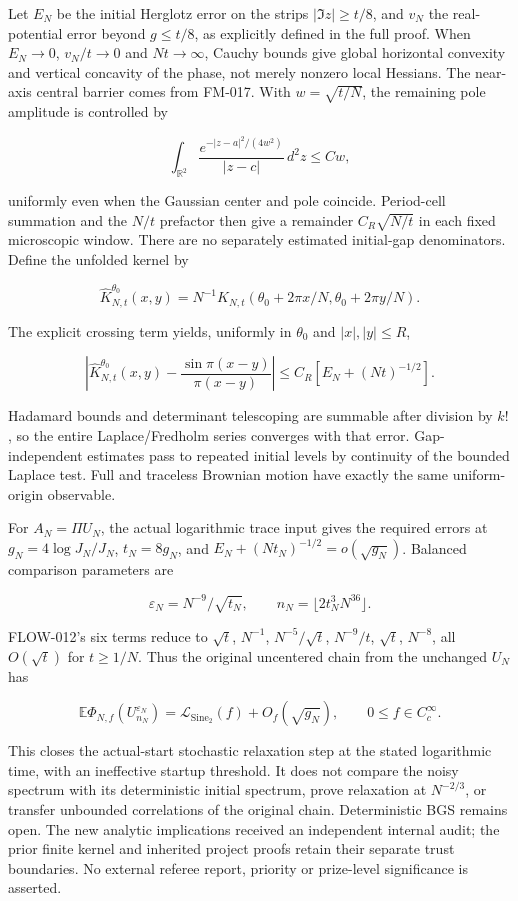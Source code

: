 Let \(E_N\) be the initial Herglotz error on the strips \(|\Im z|\ge t/8\),
and \(v_N\) the real-potential error beyond \(g\le t/8\), as explicitly
defined in the full proof. When \(E_N\to0\), \(v_N/t\to0\) and \(Nt\to\infty\),
Cauchy bounds give global horizontal convexity and vertical concavity
of the phase, not merely nonzero local Hessians. The near-axis central
barrier comes from FM-017. With \(w=\sqrt{t/N}\), the remaining pole
amplitude is controlled by

\[
\int_{\mathbb R^2}\frac{e^{-|z-a|^2/(4w^2)}}{|z-c|}\,d^2z\le Cw,
\]

uniformly even when the Gaussian center and pole coincide.
Period-cell summation and the \(N/t\) prefactor then give a remainder
\(C_R\sqrt{N/t}\) in each fixed microscopic window. There are no separately
estimated initial-gap denominators. Define the unfolded kernel by

\[
\widehat K_{N,t}^{\theta_0}(x,y)
=N^{-1}K_{N,t}(\theta_0+2\pi x/N,\theta_0+2\pi y/N).
\]

The explicit crossing term yields, uniformly in \(\theta_0\) and \(|x|,|y|\le R\),

\[
\left|\widehat K_{N,t}^{\theta_0}(x,y)
-\frac{\sin\pi(x-y)}{\pi(x-y)}\right|
\le C_R[E_N+(Nt)^{-1/2}].
\]

Hadamard bounds and determinant telescoping are summable after division
by \(k!\), so the entire Laplace/Fredholm series converges with that error.
Gap-independent estimates pass to repeated initial levels by continuity
of the bounded Laplace test. Full and traceless Brownian motion have
exactly the same uniform-origin observable.

For \(A_N=\Pi U_N\), the actual logarithmic trace input gives the required
errors at \(g_N=4\log J_N/J_N\), \(t_N=8g_N\), and
\(E_N+(Nt_N)^{-1/2}=o(\sqrt{g_N})\). Balanced comparison parameters are

\[
\varepsilon_N=N^{-9}/\sqrt{t_N},\qquad
n_N=\lfloor2t_N^3N^{36}\rfloor.
\]

FLOW-012's six terms reduce to
\(\sqrt t\), \(N^{-1}\), \(N^{-5}/\sqrt t\), \(N^{-9}/t\),
\(\sqrt t\), \(N^{-8}\), all \(O(\sqrt t)\) for \(t\ge1/N\).
Thus the original uncentered chain from the unchanged \(U_N\) has

\[
\mathbb E\Phi_{N,f}(U_{n_N}^{\varepsilon_N})
=\mathcal L_{\mathrm{Sine}_2}(f)+O_f(\sqrt{g_N}),
\qquad 0\le f\in C_c^\infty.
\]

This closes the actual-start stochastic relaxation step at the stated
logarithmic time, with an ineffective startup threshold. It does not
compare the noisy spectrum with its deterministic initial spectrum,
prove relaxation at \(N^{-2/3}\), or transfer unbounded correlations of the
original chain. Deterministic BGS remains open. The new analytic
implications received an independent internal audit; the prior finite
kernel and inherited project proofs retain their separate trust boundaries.
No external referee report, priority or prize-level significance is asserted.


